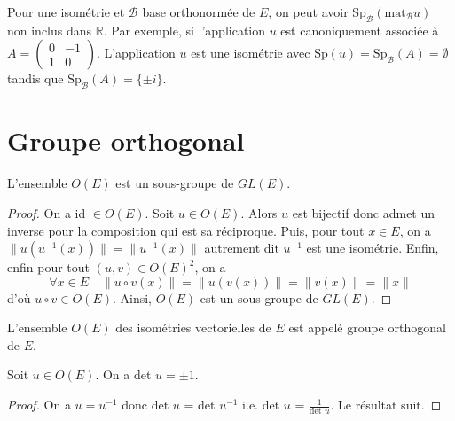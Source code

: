 \begin{remark}

Pour une isométrie et $\mathcal{B}$ base orthonormée de $E$, on peut avoir $\text{Sp}_ \mathcal{B} (\text{mat}_{ \mathcal{B} } u)$ non inclus dans $\mathbb{R}$. Par exemple, si l'application $u$ est canoniquement associée à $A = \begin{pmatrix} 0 & -1 \\ 1 & 0 \end{pmatrix}$.
L'application $u$ est une isométrie avec $\text{Sp}(u) = \text{Sp}_ \mathcal{B} (A) = \emptyset$ tandis que $\text{Sp}_ \mathcal{B} (A) = \{ \pm i \}$.

\end{remark}

\section{Groupe orthogonal}

\begin{proposition}
\label{prop:9}

L'ensemble $O(E)$ est un sous-groupe de $GL(E)$.
\end{proposition}

\begin{proof}

On a id $\in O(E)$. Soit $u \in O(E)$. Alors $u$ est bijectif donc admet un inverse pour la composition qui est sa réciproque. Puis, pour tout $x \in E$, on a $\|u(u^{-1}(x))\| = \|u^{-1}(x)\|$ autrement dit $u^{-1}$ est une isométrie. Enfin, enfin pour tout $(u,v) \in O(E)^2$, on a
\[
\forall x \in E \quad \|u \circ v(x)\| = \|u(v(x))\| = \|v(x)\| = \|x\|
\]
d'où $u \circ v \in O(E)$. Ainsi, $O(E)$ est un sous-groupe de $GL(E)$.

\end{proof}

\begin{definition}
\label{def:3}

L'ensemble $O(E)$ des isométries vectorielles de $E$ est appelé groupe orthogonal de $E$.

\end{definition}

\begin{proposition}
\label{prop:10}

Soit $u \in O(E)$. On a det $u = \pm 1$.
\end{proposition}

\begin{proof}

On a $u = u^{-1}$ donc det $u$ = det $u^{-1}$ i.e. det $u$ = $\frac{1}{\text{det } u}$. Le résultat suit.

\end{proof}

